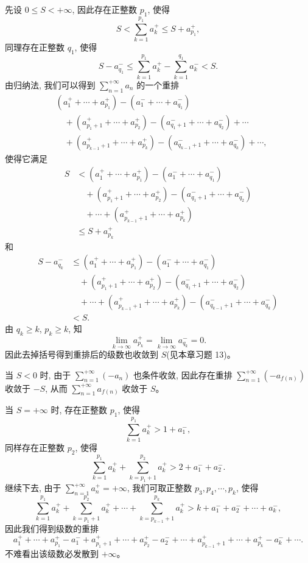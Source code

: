 \documentclass[UTF8, 12pt, fontset=fandol, oneside]{ctexart}
\begin{document}
先设 $0\leq S<+\infty$, 因此存在正整数 $p_1$, 使得
\[
  S<\sum_{k=1}^{p_1}a_k^+\leq S+a_{p_1}^+,
\]
同理存在正整数 $q_1$, 使得
\[
  S-a_{q_1}^-\leq\sum_{k=1}^{p_1}a_k^+-\sum_{k=1}^{q_1}a_k^-<S.
\]
由归纳法, 我们可以得到 $\sum\limits_{n=1}^{+\infty}a_n$ 的一个重排
\[
\begin{aligned}
  &(a_1^++\cdots+a_{p_1}^+)-(a_1^-+\cdots+a_{q_1}^-)\\
  &\quad +(a_{p_1+1}^++\cdots+a_{p_2}^+)-(a_{q_1+1}^-+\cdots+a_{q_2}^-)+\cdots\\
  &\quad +(a_{p_{k-1}+1}^++\cdots+a_{p_k}^+)-(a_{q_{k-1}+1}^-+\cdots+a_{q_k}^-)+\cdots,
\end{aligned}
\]
使得它满足
\[
\begin{aligned}
  S
  &< (a_1^++\cdots+a_{p_1}^+)-(a_1^-+\cdots+a_{q_1}^-)\\
  &\quad +(a_{p_1+1}^++\cdots+a_{p_2}^+)-(a_{q_1+1}^-+\cdots+a_{q_2}^-)\\
  &\quad +\cdots+(a_{p_{k-1}+1}^++\cdots+a_{p_k}^+)\\
  &\leq S+a_{p_k}^+
\end{aligned}
\]
和
\[
\begin{aligned}
  S-a_{q_k}^-
  &\leq (a_1^++\cdots+a_{p_1}^+)-(a_1^-+\cdots+a_{q_1}^-)\\
  &\quad +(a_{p_1+1}^++\cdots+a_{p_2}^+)-(a_{q_1+1}^-+\cdots+a_{q_2}^-)\\
  &\quad +\cdots+(a_{p_{k-1}+1}^++\cdots+a_{p_k}^+)-(a_{q_{k-1}+1}^-+\cdots+a_{q_k}^-)\\
  &<S.
\end{aligned}
\]
由 $q_k\geq k$, $p_k\geq k$, 知
\[
  \lim_{k\to\infty}a_{p_k}^+=\lim_{k\to\infty}a_{q_k}^-=0.
\]
因此去掉括号得到重排后的级数也收敛到 $S$(见本章习题 13)。

当 $S<0$ 时, 由于 $\sum\limits_{n=1}^{+\infty}(-a_n)$ 也条件收敛, 因此存在重排 $\sum\limits_{n=1}^{+\infty}(-a_{f(n)})$ 收敛于 $-S$, 从而 $\sum\limits_{n=1}^{+\infty}a_{f(n)}$ 收敛于 $S$。

当 $S=+\infty$ 时, 存在正整数 $p_1$, 使得
\[
  \sum_{k=1}^{p_1}a_k^+>1+a_1^-,
\]
同样存在正整数 $p_2$, 使得
\[
  \sum_{k=1}^{p_1}a_k^++\sum_{k=p_1+1}^{p_2}a_k^+>2+a_1^-+a_2^-.
\]
继续下去, 由于 $\sum\limits_{n=1}^{+\infty}a_n^+=+\infty$, 我们可取正整数 $p_3,p_4,\cdots,p_k$, 使得
\[
  \sum_{k=1}^{p_1}a_k^++\sum_{k=p_1+1}^{p_2}a_k^++\cdots+\sum_{k=p_{k-1}+1}^{p_k}a_k^+
  > k+a_1^-+a_2^-+\cdots+a_k^-,
\]
因此我们得到级数的重排
\[
  a_1^++\cdots+a_{p_1}^+-a_1^-+a_{p_1+1}^++\cdots+a_{p_2}^+-a_2^-+\cdots
  +a_{p_{k-1}+1}^++\cdots+a_{p_k}^+-a_k^-+\cdots.
\]
不难看出该级数必发散到 $+\infty$。
\end{document}
